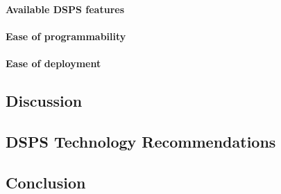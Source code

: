 \paragraph{Available DSPS features}


\paragraph{Ease of programmability}


\paragraph{Ease of deployment}





\subsection{Discussion} %
\label{sub:eval_discussion}



\subsection{DSPS Technology Recommendations} %
\label{sub:dsps_technology_recommendations}



\subsection{Conclusion} %
\label{sub:evaluation_conclusion}

